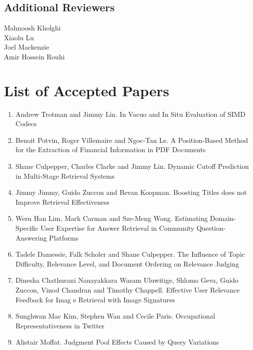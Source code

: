 \documentclass[a4paper]{article}
\begin{document}
\subsection*{Additional Reviewers}

Mahnoosh Kholghi\\
Xiaolu Lu\\
Joel Mackenzie\\
Amir Hossein Rouhi\\


\newpage

\section*{List of Accepted Papers}

\begin{enumerate}
\item Andrew Trotman and Jimmy Lin. In Vacuo and In Situ Evaluation of SIMD Codecs
    
\item Benoit Potvin, Roger Villemaire and Ngoc-Tan Le. A Position-Based Method for the Extraction of Financial Information in PDF Documents

\item Shane Culpepper, Charles Clarke and Jimmy Lin. Dynamic Cutoff Prediction in Multi-Stage Retrieval Systems

\item Jimmy Jimmy, Guido Zuccon and Bevan Koopman. Boosting Titles does not Improve Retrieval Effectiveness

\item Wern Han Lim, Mark Carman and Sze-Meng Wong. Estimating Domain-Specific User Expertise for Answer Retrieval in Community Question-Answering Platforms

\item Tadele Damessie, Falk Scholer and Shane Culpepper. The Influence of Topic Difficulty, Relevance Level, and Document Ordering on Relevance Judging

\item Dinesha Chathurani Nanayakkara Wasam Uluwitige, Shlomo Geva, Guido Zuccon, Vinod Chandran and Timothy Chappell. Effective User Relevance Feedback for Imag e Retrieval with Image Signatures 

\item Sunghwan Mac Kim, Stephen Wan and Cecile Paris. Occupational Representativeness in Twitter

\item Alistair Moffat. Judgment Pool Effects Caused by Query Variations


\end{enumerate}
\end{document}
